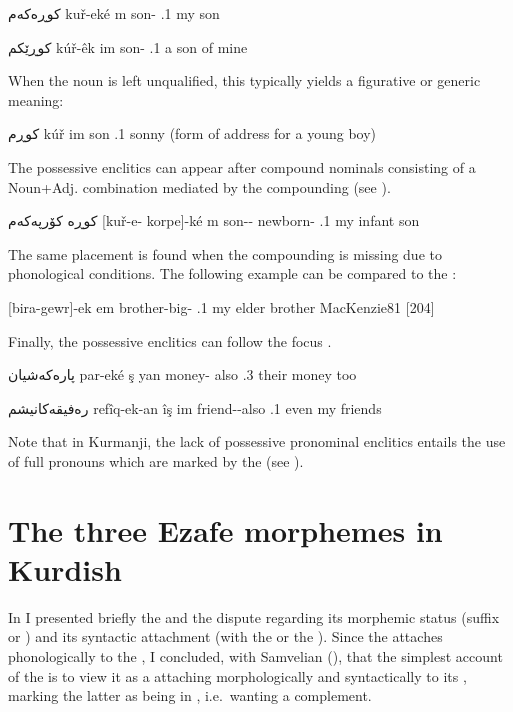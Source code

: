 {كوڕەكەم}
{kuř-eké \cb{}m}
{son- \cb\poss.1\sg}
{my son}
{\citep[16]{ThackstonSorani}}

{كوڕێكم}
{kúř-êk \cb{}im}
{son-\indef{} \cb\poss.1\sg}
{a son of mine}
{\citep[16]{ThackstonSorani}}

When the noun is left unqualified, this typically yields  a figurative or generic meaning:

{كوڕم}
{kúř \cb{}im}
{son \cb\poss.1\sg}
{sonny (form of address for a young boy)}
{\citep[16]{ThackstonSorani}}

The possessive enclitics can appear after compound nominals consisting of a Noun+Adj. combination mediated by the compounding \ez* (see ).

{كوڕە كۆرپەكەم}
{[kuř-e- korpe]-ké \cb{}m}
{son-\ez{}- newborn-  \cb\poss.1\sg}
{my infant son}
{\citep[53]{ThackstonSorani}}

The same  placement is found when the compounding \ez* is missing due to phonological conditions.  The following \War example can be compared to the  \JSul {}:

{[bira-gewr]-ek \cb{}em}
{brother-big-  \cb\poss.1\sg{}}
{my elder brother}
{MacKenzie}{81 {[204]}}
 
Finally, the possessive enclitics can follow the focus  .

{پارەكەشیان}
{par-eké \cb{}ş \cb{}yan}
{money- \cb{}also \cb\poss.3\pl}
{their money too}
{\citep[16]{ThackstonSorani}}

{رەفیقەكانیشم}
{refîq-ek-an \cb{}îş \cb{}im}
{friend--\pl \cb{}also \cb{}\poss.1\sg}
{even my friends}
{\citep[17]{ThackstonSorani}}


Note that in Kurmanji, the lack of possessive pronominal enclitics entails the use of full pronouns which are marked by the  (see ).

\section{The three Ezafe morphemes in Kurdish} \label{ss:three_Ez}

In  I presented briefly the \Per \ez* and the dispute regarding its morphemic status (suffix or ) and its syntactic attachment (with the \prim or the \secn). Since the \Per \ez* attaches phonologically to the \prim, I concluded, with Samvelian (\citeyear*{SamvelianEzafe, SamvelianHead}),
that the simplest account of the \Per \ez* is to view it as a  attaching morphologically and syntactically to its \prim, marking the latter as being in \cst*, i.e.\ wanting a complement. 

